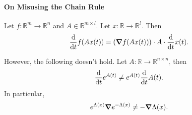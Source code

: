 \documentclass{article}
\begin{document}
\paragraph*{On Misusing the Chain Rule}

Let $f: \mathbb{R}^m \rightarrow \mathbb{R}^n$ and $A\in \mathbb{R}^{m\times l}$.
Let $x: \mathbb{R} \rightarrow \mathbb{R}^l$.
Then
\[ \dv{t} f(A x(t)) = (\grad f(A x(t))) \cdot A \cdot \dv{t} x(t). \]

However, the following doesn't hold.
Let $A: \mathbb{R} \rightarrow \mathbb{R}^{n\times n}$, then
\[ \dv{t} e^{A(t)} \neq e^{A(t)} \dv{t} A(t). \]
In particular,
\[ e^{\Lambda(x)} \grad e^{-\Lambda(x)} \neq -\grad \Lambda(x). \]

% 
% 
\end{document}
